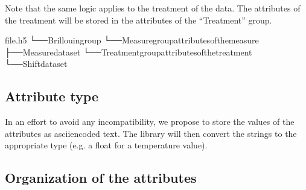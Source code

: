 \documentclass[letterpaper,10pt,english]{sphinxmanual}
\begin{document}
\sphinxAtStartPar
Note that the same logic applies to the treatment of the data. The attributes of the treatment will be stored in the attributes of the “Treatment” group.

\begin{sphinxVerbatim}[commandchars=\\\{\}]
file.h5
└──Brillouingroup
└──Measuregroup\PYGZhy{}\PYGZgt{}attributesofthemeasure
├──Measuredataset
└──Treatmentgroup\PYGZhy{}\PYGZgt{}attributesofthetreatment
└──Shiftdataset
\end{sphinxVerbatim}


\subsection{Attribute type}
\label{\detokenize{source/normalization:attribute-type}}
\sphinxAtStartPar
In an effort to avoid any incompatibility, we propose to store the values of the attributes as ascii\sphinxhyphen{}encoded text. The library will then convert the strings to the appropriate type (e.g. a float for a temperature value).


\subsection{Organization of the attributes}
\label{\detokenize{source/normalization:organization-of-the-attributes}}
\end{document}
